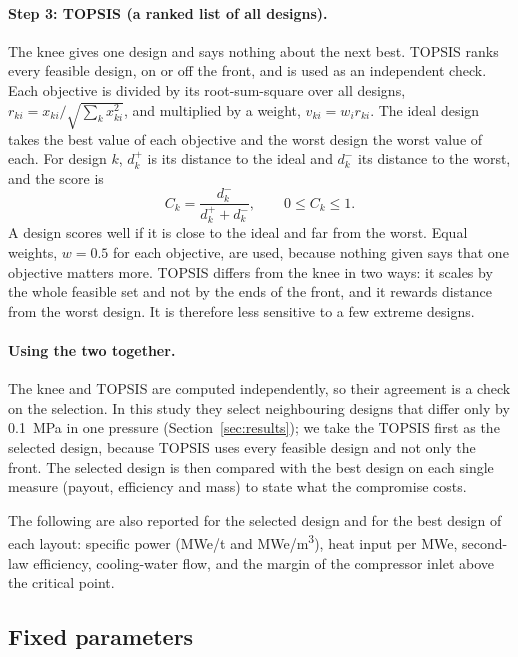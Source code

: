 \paragraph{Step 3: TOPSIS (a ranked list of all designs).} The knee gives one design and says nothing about the next best. TOPSIS ranks every feasible design, on or off the front, and is used as an independent check. Each objective is divided by its root-sum-square over all designs, $r_{ki} = x_{ki}/\sqrt{\sum_k x_{ki}^2}$, and multiplied by a weight, $v_{ki} = w_i r_{ki}$. The ideal design takes the best value of each objective and the worst design the worst value of each. For design $k$, $d_k^{+}$ is its distance to the ideal and $d_k^{-}$ its distance to the worst, and the score is
\begin{equation}
C_k = \frac{d_k^{-}}{d_k^{+} + d_k^{-}}, \qquad 0 \le C_k \le 1 .
\end{equation}
A design scores well if it is close to the ideal and far from the worst. Equal weights, $w = 0.5$ for each objective, are used, because nothing given says that one objective matters more. TOPSIS differs from the knee in two ways: it scales by the whole feasible set and not by the ends of the front, and it rewards distance from the worst design. It is therefore less sensitive to a few extreme designs.

\paragraph{Using the two together.} The knee and TOPSIS are computed independently, so their agreement is a check on the selection. In this study they select neighbouring designs that differ only by \SI{0.1}{MPa} in one pressure (Section~\ref{sec:results}); we take the TOPSIS first as the selected design, because TOPSIS uses every feasible design and not only the front. The selected design is then compared with the best design on each single measure (payout, efficiency and mass) to state what the compromise costs.

The following are also reported for the selected design and for the best design of each layout: specific power (\si{MWe/t} and \si{MWe/m^3}), heat input per \si{MWe}, second-law efficiency, cooling-water flow, and the margin of the compressor inlet above the critical point.


\subsection{Fixed parameters}

